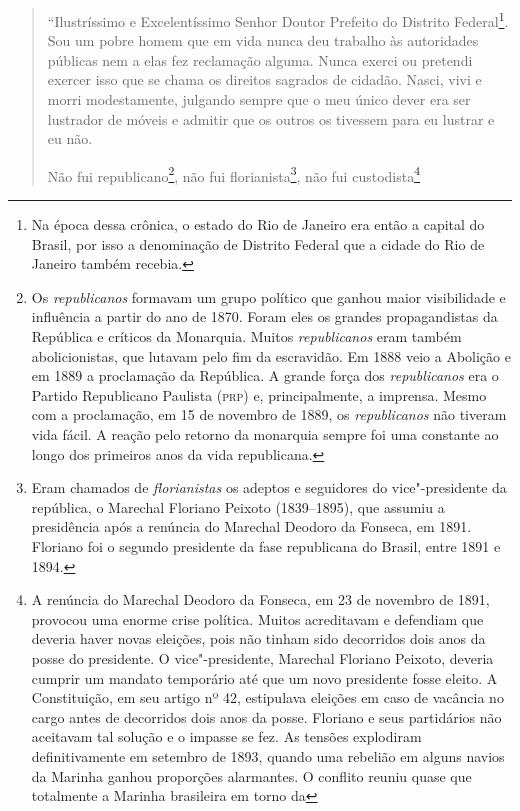 \begin{quote}
``Ilustríssimo e Excelentíssimo Senhor Doutor Prefeito do Distrito
Federal\footnote{Na época dessa crônica, o estado do Rio de Janeiro era
  então a capital do Brasil, por isso a denominação de Distrito Federal
  que a cidade do Rio de Janeiro também recebia.}. Sou um pobre homem
que em vida nunca deu trabalho às autoridades públicas nem a elas fez
reclamação alguma. Nunca exerci ou pretendi exercer isso que se chama os
direitos sagrados de cidadão. Nasci, vivi e morri modestamente, julgando
sempre que o meu único dever era ser lustrador de móveis e admitir que
os outros os tivessem para eu lustrar e eu não.

Não fui republicano\footnote{Os \emph{republicanos} formavam um grupo
  político que ganhou maior visibilidade e influência a partir do ano de
  1870. Foram eles os grandes propagandistas da República e críticos da
  Monarquia. Muitos \emph{republicanos} eram também abolicionistas, que
  lutavam pelo fim da escravidão. Em 1888 veio a Abolição e em 1889 a
  proclamação da República. A grande força dos \emph{republicanos} era o
  Partido Republicano Paulista (\textsc{prp}) e, principalmente, a imprensa.
  Mesmo com a proclamação, em 15 de novembro de 1889, os
  \emph{republicanos} não tiveram vida fácil. A reação pelo retorno da
  monarquia sempre foi uma constante ao longo dos primeiros anos da vida
  republicana.}, não fui florianista\footnote{Eram chamados de
  \emph{florianistas} os adeptos e seguidores do vice"-presidente da
  república, o Marechal Floriano Peixoto (1839--1895), que assumiu a
  presidência após a renúncia do Marechal Deodoro da Fonseca, em 1891.
  Floriano foi o segundo presidente da fase republicana do Brasil, entre
  1891 e 1894.}, não fui custodista\footnote{A renúncia do Marechal
  Deodoro da Fonseca, em 23 de novembro de 1891, provocou uma enorme
  crise política. Muitos acreditavam e defendiam que deveria haver novas
  eleições, pois não tinham sido decorridos dois anos da posse do
  presidente. O vice"-presidente, Marechal Floriano Peixoto, deveria
  cumprir um mandato temporário até que um novo presidente fosse eleito.
  A Constituição, em seu artigo nº 42, estipulava eleições em caso de
  vacância no cargo antes de decorridos dois anos da posse. Floriano e
  seus partidários não aceitavam tal solução e o impasse se fez. As
  tensões explodiram definitivamente em setembro de 1893, quando uma
  rebelião em alguns navios da Marinha ganhou proporções alarmantes. O
  conflito reuniu quase que totalmente a Marinha brasileira em torno da
}
\end{quote}
